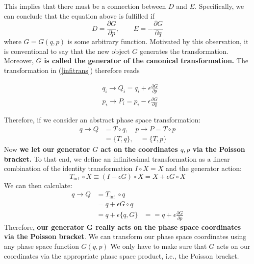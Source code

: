 This implies that there must be a connection between $D$ and $E$. Specifically, we can conclude that the equation above is fulfilled if 
\begin{equation}
D=\frac{\partial G}{\partial p}, \quad \quad E=-\frac{\partial G}{\partial q}
\end{equation}
where $G=G(q, p)$ is some arbitrary function. Motivated by this observation, it is conventional to say that the new object $G$ generates the transformation. Moreover, \textbf{$G$ is called the generator of the canonical transformation.} The transformation in (\ref{infitrans}) therefore reads
\begin{qt}
    \begin{equation}
\begin{aligned}
&q_{i} \rightarrow Q_{i}=q_{i}+\epsilon \frac{\partial G}{\partial p}\\
&p_{i} \rightarrow P_{i}=p_{i}-\epsilon \frac{\partial G}{\partial q}
\end{aligned}
\label{infitrans2}
\end{equation}
\end{qt}
 Therefore, if we consider an abstract phase space transformation:
$$
\begin{aligned}
q \rightarrow Q &=T \circ q, \quad p \rightarrow P=T \circ p \\
&=\{T, q\}, \quad=\{T, p\}
\end{aligned}
$$
Now \textbf{we let our generator $G$ act on the coordinates $q,p$ via the Poisson bracket.} To that end, we define an infinitesimal transformation as a linear combination of the identity transformation $I\circ X=X$ and the generator action:
$$
T_{\text {inf }} \circ X \equiv(I+\epsilon G) \circ X=X+\epsilon G \circ X
$$
We can then calculate:
$$
\begin{aligned}
q \rightarrow Q &=T_{\text {inf }} \circ q \\
&=q+\epsilon G \circ q \\
&=q+\epsilon\{q, G\}
&==q+\epsilon \frac{\partial G}{\partial p}
\end{aligned}
$$
Therefore, \textbf{our generator G really acts on the phase space coordinates via the Poisson bracket}. We can transform our phase space coordinates using any phase space function $G(q, p)$ We only have to make sure that $G$ acts on our coordinates via the appropriate phase space product, i.e., the Poisson bracket.

